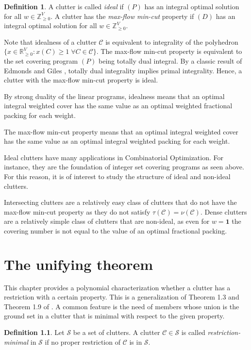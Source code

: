 \documentclass[a4paper, 12pt]{scrbook}
\theoremstyle{definition}
\newtheorem*{definition}{Definition}
\newcommand*{\IR}{\ensuremath{\mathbb{R}}}
\newcommand*{\IZ}{\ensuremath{\mathbb{Z}}}
\begin{document}
   \begin{definition}
       A clutter is called \emph{ideal} if $(P)$ has an integral optimal solution for all $w \in \IZ^V_{\geq 0}$. A clutter has the \emph{max-flow min-cut} property if $(D)$ has an integral optimal solution for all $w \in \IZ^V_{\geq 0}$.
   \end{definition}
   Note that idealness of a clutter $\mathcal{C}$ is equivalent to integrality of the polyhedron $\{x \in \IR^V_{\geq 0}: x(C) \geq 1 \; \forall C \in \mathcal{C}\}$.
   The max-flow min-cut property is equivalent to the set covering program $(P)$ being totally dual integral.
   By a classic result of Edmonds and Giles \cite{tdi}, totally dual integrality implies primal integrality.
   Hence, a clutter with the max-flow min-cut property is ideal.

   By strong duality of the linear programs, idealness means that an optimal integral weighted cover has the same value as an optimal weighted fractional packing for each weight.

   The max-flow min-cut property means that an optimal integral weighted cover has the same value as an optimal integral weighted packing for each weight.

   Ideal clutters have many applications in Combinatorial Optimization. For instance, they are the foundation of integer set covering programs as seen above. For this reason, it is of interest to study the structure of ideal and non-ideal clutters.

   Intersecting clutters are a relatively easy class of clutters that do not have the max-flow min-cut property as they do not satisfy $\tau(\mathcal{C})=\nu(\mathcal{C})$. Dense clutters are a relatively simple class of clutters that are non-ideal, as even for $w=\textbf{1}$ the covering number is not equal to the value of an optimal fractional packing.

\chapter{The unifying theorem}
This chapter provides a polynomial characterization whether a clutter has a restriction with a certain property.
This is a generalization of Theorem 1.3 and Theorem 1.9 of \cite{restrictions}.
A common feature is the need of members whose union is the ground set in a clutter that is minimal with respect to the given property.
   \begin{definition}
       Let $\mathcal{S}$ be a set of clutters.
       A clutter $\mathcal{C} \in \mathcal{S}$ is called \emph{restriction-minimal} in $\mathcal{S}$ if no proper restriction of $\mathcal{C}$ is in $\mathcal{S}$.
   \end{definition}
\end{document}

